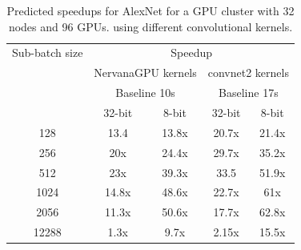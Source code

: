 \documentclass{article} %
\begin{document}
\begin{table}[h]
	\caption{Predicted speedups for AlexNet for a GPU cluster with 32 nodes and 96 GPUs. using different convolutional kernels. }
	\label{sample-table}
	\begin{minipage}
		{\linewidth}
		\centering
		\begin{tabular}{ ccccc}
			\toprule[1.5pt]
			Sub-batch size &   \multicolumn{4}{c}{Speedup}    \\
			& \multicolumn{2}{c}{NervanaGPU kernels} & \multicolumn{2}{c}{convnet2 kernels} \\
			& \multicolumn{2}{c}{Baseline 10s} & \multicolumn{2}{c}{Baseline 17s}\\
			&    32-bit & 8-bit			&   32-bit & 8-bit  \\
			\midrule	
			128 & 13.4 & 13.8x		& 20.7x & 21.4x\\
			256 & 20x & 24.4x & 29.7x & 35.2x\\	
			512  & 23x & 39.3x & 33.5 & 51.9x\\		
			1024 & 14.8x & 48.6x & 22.7x & 61x\\				
	   		2056 & 11.3x & 50.6x & 17.7x & 62.8x\\				
	   		12288 & 1.3x & 9.7x & 2.15x & 15.5x\\				
			\bottomrule[1.25pt]
		\end{tabular}
		\par
		\bigskip
	\end{minipage}
\end{table}
\end{document}
